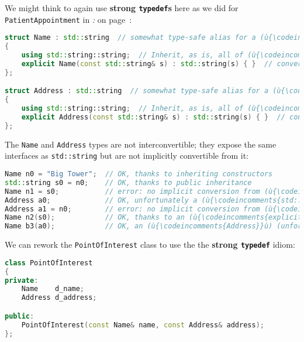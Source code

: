 \noindent We might think to again use \textbf{strong \texttt{typedef}s} here as we
did for \texttt{PatientAppointment} in \textit{: } on page~\pageref{implementing-a-strong-typedef}:

\begin{lstlisting}[language=C++]
struct Name : std::string  // somewhat type-safe alias for a (ù{\codeincomments{std::string}}ù)
{
    using std::string::string;  // Inherit, as is, all of (ù{\codeincomments{std::string}}ù)'s ctors.
    explicit Name(const std::string& s) : std::string(s) { }  // conversion
};

struct Address : std::string  // somewhat type-safe alias for a (ù{\codeincomments{std::string}}ù)
{
    using std::string::string;  // Inherit, as is, all of (ù{\codeincomments{std::string}}ù)'s ctors.
    explicit Address(const std::string& s) : std::string(s) { }  // conversion
};
\end{lstlisting}
    
\noindent The \texttt{Name} and \texttt{Address} types are not interconvertible; they expose the same interfaces as \texttt{std::string} but are not
implicitly convertible from it:

\begin{lstlisting}[language=C++]
Name n0 = "Big Tower";  // OK, thanks to inheriting constructors
std::string s0 = n0;    // OK, thanks to public inheritance
Name n1 = s0;           // error: no implicit conversion from (ù{\codeincomments{std::string}}ù)
Address a0;             // OK, unfortunately a (ù{\codeincomments{std::string}}ù) has a default ctor.
Address a1 = n0;        // error: no implicit conversion from (ù{\codeincomments{Name}}ù)
Name n2(s0);            // OK, thanks to an (ù{\codeincomments{explicit}}ù) constructor in (ù{\codeincomments{Name}}ù)
Name b3(a0);            // OK, an (ù{\codeincomments{Address}}ù) (unfortunately) is a (ù{\codeincomments{std::string}}ù).
\end{lstlisting}
    
\noindent We can rework the \texttt{PointOfInterest} class to use the the
\textbf{strong \texttt{typedef}} idiom:

\begin{lstlisting}[language=C++]
class PointOfInterest
{
private:
    Name    d_name;
    Address d_address;

public:
    PointOfInterest(const Name& name, const Address& address);
};
\end{lstlisting}
    
